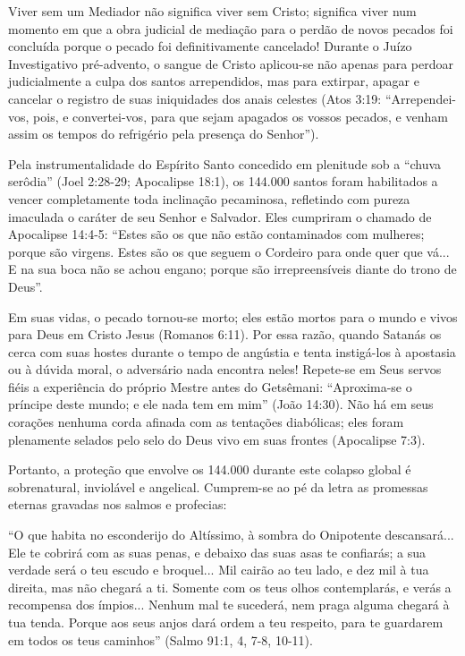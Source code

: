 Viver sem um Mediador não significa viver sem Cristo; significa viver num momento em que a obra judicial de mediação para o perdão de novos pecados foi concluída porque o pecado foi definitivamente cancelado! Durante o Juízo Investigativo pré-advento, o sangue de Cristo aplicou-se não apenas para perdoar judicialmente a culpa dos santos arrependidos, mas para extirpar, apagar e cancelar o registro de suas iniquidades dos anais celestes (Atos 3:19: ``Arrependei-vos, pois, e convertei-vos, para que sejam apagados os vossos pecados, e venham assim os tempos do refrigério pela presença do Senhor'').

Pela instrumentalidade do Espírito Santo concedido em plenitude sob a ``chuva serôdia'' (Joel 2:28-29; Apocalipse 18:1), os 144.000 santos foram habilitados a vencer completamente toda inclinação pecaminosa, refletindo com pureza imaculada o caráter de seu Senhor e Salvador. Eles cumpriram o chamado de Apocalipse 14:4-5: ``Estes são os que não estão contaminados com mulheres; porque são virgens. Estes são os que seguem o Cordeiro para onde quer que vá... E na sua boca não se achou engano; porque são irrepreensíveis diante do trono de Deus''.

Em suas vidas, o pecado tornou-se morto; eles estão mortos para o mundo e vivos para Deus em Cristo Jesus (Romanos 6:11). Por essa razão, quando Satanás os cerca com suas hostes durante o tempo de angústia e tenta instigá-los à apostasia ou à dúvida moral, o adversário nada encontra neles! Repete-se em Seus servos fiéis a experiência do próprio Mestre antes do Getsêmani: ``Aproxima-se o príncipe deste mundo; e ele nada tem em mim'' (João 14:30). Não há em seus corações nenhuma corda afinada com as tentações diabólicas; eles foram plenamente selados pelo selo do Deus vivo em suas frontes (Apocalipse 7:3).

Portanto, a proteção que envolve os 144.000 durante este colapso global é sobrenatural, inviolável e angelical. Cumprem-se ao pé da letra as promessas eternas gravadas nos salmos e profecias:

``O que habita no esconderijo do Altíssimo, à sombra do Onipotente descansará... Ele te cobrirá com as suas penas, e debaixo das suas asas te confiarás; a sua verdade será o teu escudo e broquel... Mil cairão ao teu lado, e dez mil à tua direita, mas não chegará a ti. Somente com os teus olhos contemplarás, e verás a recompensa dos ímpios... Nenhum mal te sucederá, nem praga alguma chegará à tua tenda. Porque aos seus anjos dará ordem a teu respeito, para te guardarem em todos os teus caminhos'' (Salmo 91:1, 4, 7-8, 10-11).

